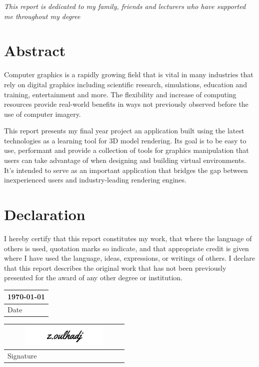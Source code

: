 \documentclass[11pt]{article}
\begin{document}
\pagebreak
\pagestyle{empty}


\begin{center}
\thispagestyle{empty}  
\vspace*{\fill}
\textit{This report is dedicated to my family, friends and lecturers who have supported me throughout my degree}
\vspace*{\fill}
\end{center}


\pagebreak

\section*{Abstract}
Computer graphics is a rapidly growing field that is vital in many industries
that rely on digital graphics including scientific research, simulations,
education and training, entertainment and more. The flexibility and increase of
computing resources provide real-world benefits in ways not previously observed
before the use of computer imagery.

This report presents my final year project an application built using the latest
technologies as a learning tool for 3D model rendering. Its goal is to be easy
to use, performant and provide a collection of tools for graphics manipulation
that users can take advantage of when designing and building virtual
environments. It's intended to serve as an important application that bridges
the gap between inexperienced users and industry-leading rendering engines.

\pagebreak

\section*{Declaration}
I hereby certify that this report constitutes my work, that where the language
of others is used, quotation marks so indicate, and that appropriate credit is
given where I have used the language, ideas, expressions, or writings of others.
I declare that this report describes the original work that has not been
previously presented for the award of any other degree or institution.

\noindent
\begin{tabular}[b]{@{} p{6cm} @{}}
\today \\
\hline
\scriptsize Date
\end{tabular}\qquad
\begin{tabular}[b]{@{} p{6cm} @{}}
\includegraphics[width=6cm,height=1cm]{images/signature.png} \\
\hline
\scriptsize Signature
\end{tabular}
\end{document}
